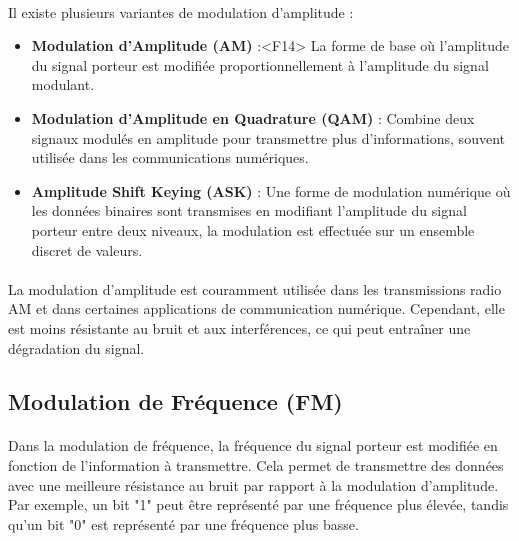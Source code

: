 \documentclass[a4paper,twocolumn]{report}
\begin{document}
\paragraph{}Il existe plusieurs variantes de modulation d'amplitude :
\begin{itemize}
	\item \textbf{Modulation d'Amplitude (AM)} :<F14>
    La forme de base où l'amplitude du signal porteur est modifiée proportionnellement à l'amplitude du signal modulant.
	\item \textbf{Modulation d'Amplitude en Quadrature (QAM)} : 
    Combine deux signaux modulés en amplitude pour transmettre plus d'informations,
    souvent utilisée dans les communications numériques.
	\item \textbf{Amplitude Shift Keying (ASK)} :
    Une forme de modulation numérique où les données binaires sont transmises en
    modifiant l'amplitude du signal porteur entre deux niveaux,
    la modulation est effectuée sur un ensemble discret de valeurs.
\end{itemize}
\paragraph{}La modulation d'amplitude est couramment utilisée dans les transmissions
radio AM et dans certaines applications de communication numérique. Cependant,
elle est moins résistante au bruit et aux interférences, ce qui peut entraîner une dégradation du signal.

\subsection{Modulation de Fréquence (FM)}
\paragraph{}Dans la modulation de fréquence, la fréquence du signal porteur est 
modifiée en fonction de l'information à transmettre. Cela permet de transmettre
des données avec une meilleure résistance au bruit par rapport à la modulation d'amplitude.
Par exemple, un bit "1" peut être représenté par une fréquence plus élevée,
tandis qu'un bit "0" est représenté par une fréquence plus basse. 
\end{document}

